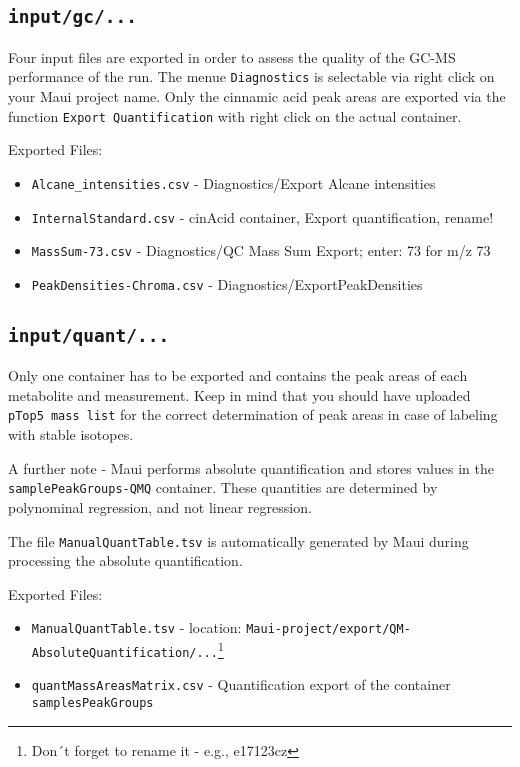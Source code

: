 \documentclass[]{book}
\providecommand{\tightlist}{%
  \setlength{\itemsep}{0pt}\setlength{\parskip}{0pt}}
\let\rmarkdownfootnote\footnote%
\def\footnote{\protect\rmarkdownfootnote}
\theoremstyle{definition}
\theoremstyle{definition}
\theoremstyle{definition}
\theoremstyle{remark}
\begin{document}
\subsection{\texorpdfstring{\texttt{input/gc/...}}{input/gc/...}}\label{inputgc...}

Four input files are exported in order to assess the quality of the
GC-MS performance of the run. The menue \texttt{Diagnostics} is
selectable via right click on your Maui project name. Only the cinnamic
acid peak areas are exported via the function
\texttt{Export\ Quantification} with right click on the actual
container.

Exported Files:

\begin{itemize}
\tightlist
\item
  \texttt{Alcane\_intensities.csv} - Diagnostics/Export Alcane
  intensities
\item
  \texttt{InternalStandard.csv} - cinAcid container, Export
  quantification, rename!
\item
  \texttt{MassSum-73.csv} - Diagnostics/QC Mass Sum Export; enter: 73
  for m/z 73
\item
  \texttt{PeakDensities-Chroma.csv} - Diagnostics/ExportPeakDensities
\end{itemize}

\subsection{\texorpdfstring{\texttt{input/quant/...}}{input/quant/...}}\label{inputquant...}

Only one container has to be exported and contains the peak areas of
each metabolite and measurement. Keep in mind that you should have
uploaded \texttt{pTop5\ mass\ list} for the correct determination of
peak areas in case of labeling with stable isotopes.

A further note - Maui performs absolute quantification and stores values
in the \texttt{samplePeakGroups-QMQ} container. These quantities are
determined by polynominal regression, and not linear regression.

The file \texttt{ManualQuantTable.tsv} is automatically generated by
Maui during processing the absolute quantification.

Exported Files:

\begin{itemize}
\tightlist
\item
  \texttt{ManualQuantTable.tsv} - location:
  \texttt{Maui-project/export/QM-AbsoluteQuantification/...}\footnote{Don´t
    forget to rename it - e.g., e17123cz}
\item
  \texttt{quantMassAreasMatrix.csv} - Quantification export of the
  container \texttt{samplesPeakGroups}
\end{itemize}
\end{document}
